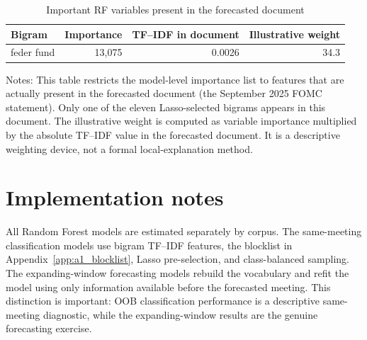 \begin{table}[H]
\centering
\caption{Important RF variables present in the forecasted document}
\label{tab:rf_single_xw_present_terms}
\begin{threeparttable}
\small
\begin{tabular}{lrrr}
\toprule
Bigram & Importance & TF--IDF in document & Illustrative weight \\
\midrule
feder fund & 13{,}075 & 0.0026 & 34.3 \\
\bottomrule
\end{tabular}
\begin{tablenotes}[flushleft]
\footnotesize
\item Notes: This table restricts the model-level importance list to features
that are actually present in the forecasted document (the September 2025 FOMC
statement). Only one of the eleven Lasso-selected bigrams appears in this
document. The illustrative weight is computed as variable importance multiplied
by the absolute TF--IDF value in the forecasted document. It is a descriptive
weighting device, not a formal local-explanation method.
\end{tablenotes}
\end{threeparttable}
\end{table}

\section{Implementation notes}
\label{app:a3_implementation_notes}

All Random Forest models are estimated separately by corpus. The same-meeting
classification models use bigram TF--IDF features, the blocklist in
Appendix~\ref{app:a1_blocklist}, Lasso pre-selection, and class-balanced
sampling. The expanding-window forecasting models rebuild the vocabulary and
refit the model using only information available before the forecasted meeting.
This distinction is important: OOB classification performance is a descriptive
same-meeting diagnostic, while the expanding-window results are the genuine
forecasting exercise.